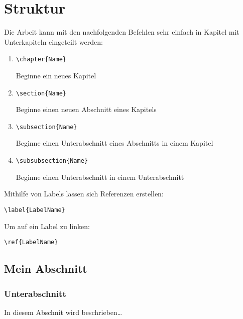 \chapter{Struktur}

Die Arbeit kann mit den nachfolgenden Befehlen sehr einfach in Kapitel mit Unterkapiteln eingeteilt werden:
\begin{enumerate}
 \item \begin{verbatim}\chapter{Name}\end{verbatim} Beginne ein neues Kapitel
 \item \begin{verbatim}\section{Name}\end{verbatim} Beginne einen neuen Abschnitt eines Kapitels
 \item \begin{verbatim}\subsection{Name}\end{verbatim} Beginne einen Unterabschnitt eines Abschnitts in einem Kapitel
 \item \begin{verbatim}\subsubsection{Name}\end{verbatim} Beginne einen Unterabschnitt in einem Unterabschnitt
\end{enumerate}

Mithilfe von Labels lassen sich Referenzen erstellen: \begin{verbatim}\label{LabelName}\end{verbatim}
Um auf ein Label zu linken: \begin{verbatim}\ref{LabelName}\end{verbatim}

\section{Mein Abschnitt}
\subsection{Unterabschnitt}
\label{MeinUnterabschnitt}
In diesem Abschnit wird beschrieben\ldots

